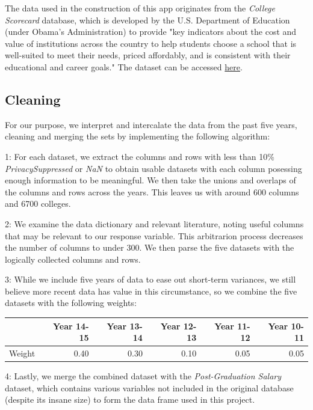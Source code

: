\documentclass{article}\usepackage[]{graphicx}\usepackage[]{color}
\begin{document}
The data used in the construction of this app originates from the \emph{College Scorecard} database, which is developed by the U.S. Department of Education (under Obama's Administration) to provide "key indicators about the cost and value of institutions across the country to help students choose a school that is well-suited to meet their needs, priced affordably, and is consistent with their educational and career goals." The dataset can be accessed  \href{https://collegescorecard.ed.gov/data/}{here}.

\subsection{Cleaning}
For our purpose, we interpret and intercalate the data from the past five years, cleaning and merging the sets by implementing the following algorithm:\newline

1: For each dataset, we extract the columns and rows with less than 10\% \emph{PrivacySuppressed} or \emph{NaN} to obtain usable datasets with each column posessing enough information to be meaningful. We then take the unions and overlaps of the columns and rows across the years. This leaves us with around 600 columns and 6700 colleges.\newline


2: We examine the data dictionary and relevant literature, noting useful columns that may be relevant to our response variable. This arbitrarion process decreases the number of columns to under 300. We then parse the five datasets with the logically collected columns and rows.\newline

3: While we include five years of data to ease out short-term variances, we still believe more recent data has value in this circumstance, so we combine the five datasets with the following weights:

\begin{table}[ht]
\centering
\begin{tabular}{rrrrrr}
  \hline
 & Year 14-15 & Year 13-14 & Year 12-13 & Year 11-12 & Year 10-11 \\ 
  \hline
Weight & 0.40 & 0.30 & 0.10 & 0.05 & 0.05 \\ 
   \hline
\end{tabular}
\end{table}


4: Lastly, we merge the combined dataset with the \emph{Post-Graduation Salary} dataset, which contains various variables not included in the original database (despite its insane size) to form the data frame used in this project. 
\end{document}
